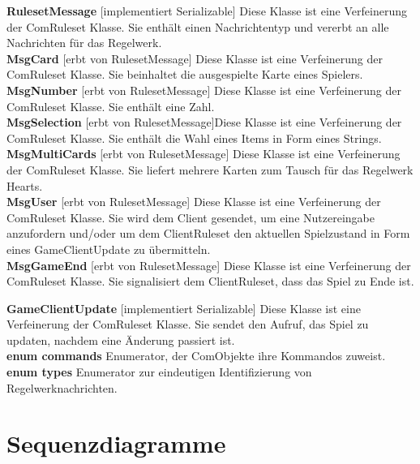 \documentclass{article}
\begin{document}
\textbf{RulesetMessage} [implementiert Serializable] Diese Klasse ist eine Verfeinerung der ComRuleset Klasse. Sie enthält einen Nachrichtentyp und vererbt an alle Nachrichten für das Regelwerk.\\
		
\textbf{MsgCard} [erbt von RulesetMessage] Diese Klasse ist eine Verfeinerung der ComRuleset Klasse. Sie beinhaltet die ausgespielte Karte eines Spielers.\\
		
\textbf{MsgNumber} [erbt von RulesetMessage] Diese Klasse ist eine Verfeinerung der ComRuleset Klasse. Sie enthält eine Zahl.\\
		
\textbf{MsgSelection} [erbt von RulesetMessage]Diese Klasse ist eine Verfeinerung der ComRuleset Klasse. Sie enthält die Wahl eines Items in Form eines Strings.\\
		
\textbf{MsgMultiCards} [erbt von RulesetMessage] Diese Klasse ist eine Verfeinerung der ComRuleset Klasse. Sie liefert mehrere Karten zum Tausch für das Regelwerk Hearts. \\
		
\textbf{MsgUser} [erbt von RulesetMessage] Diese Klasse ist eine Verfeinerung der ComRuleset Klasse. Sie wird dem Client gesendet, um eine Nutzereingabe anzufordern und/oder um dem ClientRuleset den aktuellen Spielzustand in Form eines GameClientUpdate zu übermitteln. \\

\textbf{MsgGameEnd} [erbt von RulesetMessage] Diese Klasse ist eine Verfeinerung der ComRuleset Klasse. Sie signalisiert dem ClientRuleset, dass das Spiel zu Ende ist.
		
\textbf{GameClientUpdate} [implementiert Serializable] Diese Klasse ist eine Verfeinerung der ComRuleset Klasse. Sie sendet den Aufruf, das Spiel zu updaten, nachdem eine Änderung passiert ist. \\
		
\textbf{enum commands} Enumerator, der ComObjekte ihre Kommandos zuweist. \\
		
\textbf{enum types} Enumerator zur eindeutigen Identifizierung von Regelwerknachrichten.
\ \\

\section{Sequenzdiagramme}
\end{document}
